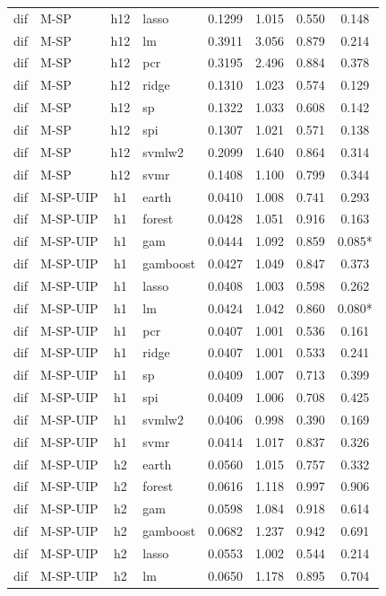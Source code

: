 \begin{ThreePartTable}
\begin{longtable}[t]{llclcccc}
dif & M-SP & h12 & lasso & 0.1299 & 1.015 & 0.550 & 0.148\\
dif & M-SP & h12 & lm & 0.3911 & 3.056 & 0.879 & 0.214\\
dif & M-SP & h12 & pcr & 0.3195 & 2.496 & 0.884 & 0.378\\
dif & M-SP & h12 & ridge & 0.1310 & 1.023 & 0.574 & 0.129\\
dif & M-SP & h12 & sp & 0.1322 & 1.033 & 0.608 & 0.142\\
dif & M-SP & h12 & spi & 0.1307 & 1.021 & 0.571 & 0.138\\
dif & M-SP & h12 & svmlw2 & 0.2099 & 1.640 & 0.864 & 0.314\\
dif & M-SP & h12 & svmr & 0.1408 & 1.100 & 0.799 & 0.344\\
\addlinespace
dif & M-SP-UIP & h1 & earth & 0.0410 & 1.008 & 0.741 & 0.293\\
dif & M-SP-UIP & h1 & forest & 0.0428 & 1.051 & 0.916 & 0.163\\
dif & M-SP-UIP & h1 & gam & 0.0444 & 1.092 & 0.859 & 0.085*\\
dif & M-SP-UIP & h1 & gamboost & 0.0427 & 1.049 & 0.847 & 0.373\\
dif & M-SP-UIP & h1 & lasso & 0.0408 & 1.003 & 0.598 & 0.262\\
dif & M-SP-UIP & h1 & lm & 0.0424 & 1.042 & 0.860 & 0.080*\\
dif & M-SP-UIP & h1 & pcr & 0.0407 & 1.001 & 0.536 & 0.161\\
dif & M-SP-UIP & h1 & ridge & 0.0407 & 1.001 & 0.533 & 0.241\\
dif & M-SP-UIP & h1 & sp & 0.0409 & 1.007 & 0.713 & 0.399\\
dif & M-SP-UIP & h1 & spi & 0.0409 & 1.006 & 0.708 & 0.425\\
dif & M-SP-UIP & h1 & svmlw2 & 0.0406 & 0.998 & 0.390 & 0.169\\
dif & M-SP-UIP & h1 & svmr & 0.0414 & 1.017 & 0.837 & 0.326\\
\addlinespace
dif & M-SP-UIP & h2 & earth & 0.0560 & 1.015 & 0.757 & 0.332\\
dif & M-SP-UIP & h2 & forest & 0.0616 & 1.118 & 0.997 & 0.906\\
dif & M-SP-UIP & h2 & gam & 0.0598 & 1.084 & 0.918 & 0.614\\
dif & M-SP-UIP & h2 & gamboost & 0.0682 & 1.237 & 0.942 & 0.691\\
dif & M-SP-UIP & h2 & lasso & 0.0553 & 1.002 & 0.544 & 0.214\\
dif & M-SP-UIP & h2 & lm & 0.0650 & 1.178 & 0.895 & 0.704\\

\end{longtable}
\end{ThreePartTable}

